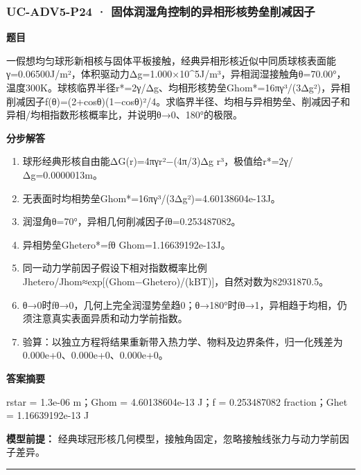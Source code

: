 \documentclass[UTF8,11pt,a4paper]{ctexart}
\begin{document}
\subsubsection*{UC-ADV5-P24 · 固体润湿角控制的异相形核势垒削减因子}
\noindent\textbf{题目}\par
一假想均匀球形新相核与固体平板接触，经典异相形核近似中同质球核表面能γ=0.06500J/m²，体积驱动力Δg=1.000×10\textasciicircum{}5J/m³，异相润湿接触角θ=70.00°，温度300K。球核临界半径r*=2γ/Δg、均相形核势垒Ghom*=16πγ³/(3Δg²)，异相削减因子f(θ)=(2+cosθ)(1−cosθ)²/4。求临界半径、均相与异相势垒、削减因子和异相/均相指数形核概率比，并说明θ→0、180°的极限。\par
\medskip\noindent\textbf{分步解答}
\begin{enumerate}
\item 球形经典形核自由能ΔG(r)=4πγr²−(4π/3)Δg r³，极值给r*=2γ/Δg=0.0000013m。
\item 无表面时均相势垒Ghom*=16πγ³/(3Δg²)=4.60138604e-13J。
\item 润湿角θ=70°，异相几何削减因子fθ=0.253487082。
\item 异相势垒Ghetero*=fθ Ghom=1.16639192e-13J。
\item 同一动力学前因子假设下相对指数概率比例Jhetero/Jhom≈exp[(Ghom−Ghetero)/(kBT)]，自然对数为82931870.5。
\item θ→0时fθ→0，几何上完全润湿势垒趋0；θ→180°时fθ→1，异相趋于均相，仍须注意真实表面异质和动力学前指数。
\item 验算：以独立方程将结果重新带入热力学、物料及边界条件，归一化残差为 0.000e+0、0.000e+0、0.000e+0。
\end{enumerate}
\noindent\textbf{答案摘要}\par
rstar = 1.3e-06 m；Ghom = 4.60138604e-13 J；f = 0.253487082 fraction；Ghet = 1.16639192e-13 J\par
\noindent\textbf{模型前提：}
经典球冠形核几何模型，接触角固定，忽略接触线张力与动力学前因子差异。\par
\medskip\hrule\medskip
{}
\end{document}
